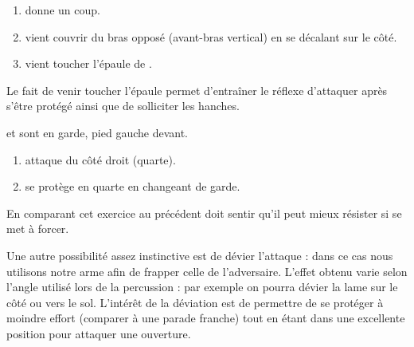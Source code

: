 \begin{exercice}
	
	

	\begin{enumerate}
		\item \A donne un coup.
		
		\item \D vient couvrir du bras opposé (avant-bras vertical) en se décalant sur le côté.
		
		\item \D vient toucher l'épaule de \A.
	\end{enumerate}

	Le fait de venir toucher l'épaule permet d'entraîner le réflexe d'attaquer après s'être protégé ainsi que de solliciter les hanches.
\end{exercice}


\begin{exercice}

	\A et \D sont en garde, pied gauche devant.

	\begin{enumerate}
		\item \A attaque \D du côté droit (quarte).
		
		\item \D se protège en quarte en changeant de garde.
	\end{enumerate}

	En comparant cet exercice au précédent \D doit sentir qu'il peut mieux résister si \A se met à forcer.
\end{exercice}


Une autre possibilité assez instinctive est de dévier l'attaque : dans ce cas nous utilisons notre arme afin de frapper celle de l'adversaire.
L'effet obtenu varie selon l'angle utilisé lors de la percussion : par exemple on pourra dévier la lame sur le côté ou vers le sol.
L'intérêt de la déviation est de permettre de se protéger à moindre effort (comparer à une parade franche) tout en étant dans une excellente position pour attaquer une ouverture.


